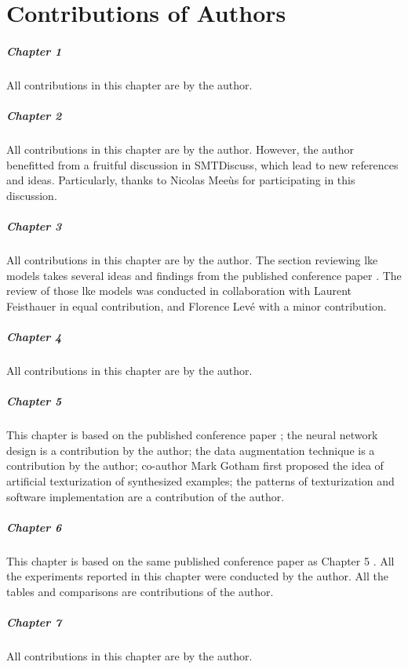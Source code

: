 \chapter*{Contributions of Authors}
\label{chap:contributionsofauthors}

\paragraph{Chapter 1}
All contributions in this chapter are by the author.

\paragraph{Chapter 2}
All contributions in this chapter are by the author.
However, the author benefitted from a fruitful discussion in
SMTDiscuss,
which lead to new references and ideas. Particularly, thanks
to Nicolas Mee\`us for participating in this discussion.

\paragraph{Chapter 3} 
All contributions in this chapter are by the author. The
section reviewing \gls{lke} models takes several ideas and
findings from the published conference paper
\textcite{napoleslopez2020local}. The review of those
\gls{lke} models was conducted in collaboration with Laurent
Feisthauer in equal contribution, and Florence Lev\'e with a
minor contribution.

\paragraph{Chapter 4} 
All contributions in this chapter are by the author.

\paragraph{Chapter 5}
This chapter is based on the published conference paper
\textcite{napoleslopez2021augmentednet}; the neural network
design is a contribution by the author; the data
augmentation technique is a contribution by the author;
co-author Mark Gotham first proposed the idea of artificial
texturization of synthesized examples; the patterns of
texturization and software implementation are a contribution
of the author.

\paragraph{Chapter 6}
This chapter is based on the same published conference paper
as Chapter 5 \parencite{napoleslopez2021augmentednet}. All
the experiments reported in this chapter were conducted by
the author. All the tables and comparisons are contributions
of the author.

\paragraph{Chapter 7}
All contributions in this chapter are by the author.
